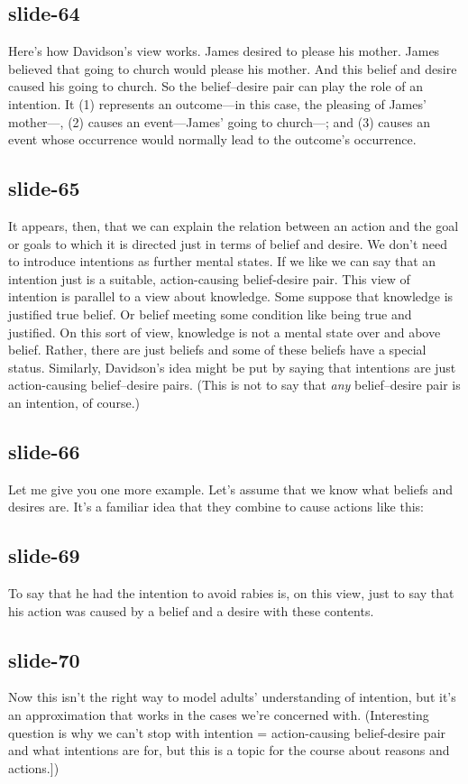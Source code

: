 \documentclass[12pt,\papersize]{extarticle}
\begin{document}
 
\subsection{slide-64}
Here's how Davidson's view works.
James desired to please his mother.
James believed that going to church would please his mother.
And this belief and desire caused his going to church.
So the belief--desire pair can play the role of an intention.
It (1) represents an outcome---in this case, the pleasing of James' mother---, (2) causes an event---James' going to church---; and (3) causes an event whose occurrence would normally lead to the outcome’s occurrence.
 
 
\subsection{slide-65}
It appears, then, that we can explain the relation between an action and the goal or goals to which it is directed just in terms of belief and desire.
We don't need to introduce intentions as further mental states.
If we like we can say that an intention just is a suitable, action-causing belief-desire pair.
This view of intention is parallel to a view about knowledge.
Some suppose that knowledge is justified true belief.
Or belief meeting some condition like being true and justified.
On this sort of view, knowledge is not a mental state over and above belief.
Rather, there are just beliefs and some of these beliefs have a special status.
Similarly, Davidson's idea might be put by saying that intentions are just action-causing belief--desire pairs.
(This is not to say that \emph{any} belief--desire pair is an intention, of course.)
 
 
\subsection{slide-66}
Let me give you one more example.
Let's assume that we know what beliefs and desires are.
It's a familiar idea that they combine to cause actions like this:
 
 
\subsection{slide-69}
To say that he had the intention to avoid rabies is, on this view, just to say that his action was caused by a belief and a desire with these contents.
 
 
\subsection{slide-70}
Now this isn't the right way to model adults' understanding of intention, but it's an approximation that works in the cases we're concerned with.
(Interesting question is why we can't stop with intention = action-causing belief-desire pair and what intentions are for, but this is a topic for the course about reasons and actions.])
 
\end{document}
